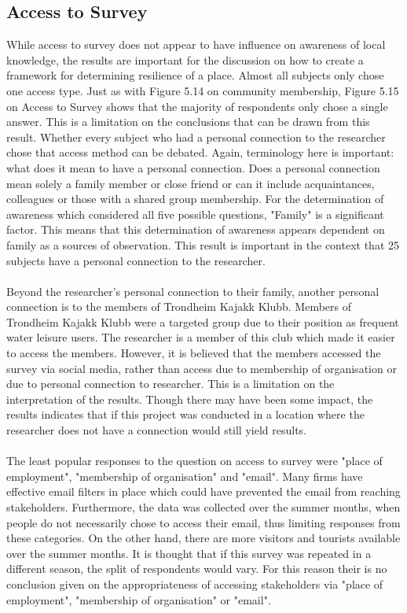\subsection{Access to Survey}
While access to survey does not appear to have influence on awareness of local knowledge, the results are important for the discussion on how to create a framework for determining resilience of a place. Almost all subjects only chose one access type. Just as with Figure 5.14 on community membership, Figure 5.15 on Access to Survey shows that the majority of respondents only chose a single answer. This is a limitation on the conclusions that can be drawn from this result. Whether every subject who had a personal connection to the researcher chose that access method can be debated. Again, terminology here is important: what does it mean to have a personal connection. Does a personal connection mean solely a family member or close friend or can it include acquaintances, colleagues or those with a shared group membership.  For the determination of awareness which considered all five possible questions, "Family" is a significant factor. This means that this determination of awareness appears dependent on family as a sources of observation. This result is important in the context that 25 subjects have a personal connection to the researcher.
\paragraph{}
Beyond the researcher's personal connection to their family, another personal connection is to the members of Trondheim Kajakk Klubb. Members of Trondheim Kajakk Klubb were a targeted group due to their position as frequent water leisure users. The researcher is a member of this club which made it easier to access the members. However, it is believed that the members accessed the survey via social media, rather than access due to  membership of organisation or due to personal connection to researcher. This is a limitation on the interpretation of the results. Though there may have been some impact, the results indicates that if this project was conducted in a location where the researcher does not have a connection would still yield results.
\paragraph{}
The least popular responses to the question on access to survey were "place of employment", "membership of organisation" and "email". Many firms have effective email filters in place which could have prevented the email from reaching stakeholders. Furthermore, the data was collected over the summer months, when people do not necessarily chose to access their email, thus limiting responses from these categories. On the other hand, there are more visitors and tourists available over the summer months. It is thought that if this survey was repeated in a different season, the split of respondents would vary. For this reason their is no conclusion given on the appropriateness of accessing stakeholders via "place of employment", "membership of organisation" or "email".
